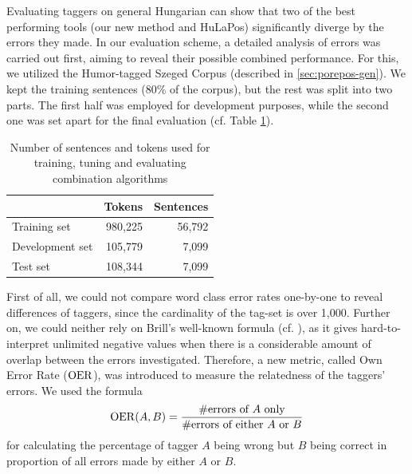 Evaluating taggers on general Hungarian can show that two of the best performing tools (our new method and HuLaPos) significantly diverge by the errors they made.
In our evaluation scheme, a detailed analysis of errors was carried out first, aiming to reveal their possible combined performance.
For this, we utilized the Humor-tagged Szeged Corpus (described in \ref{sec:porepos-gen}).
We kept the training sentences (80\% of the corpus), but the rest was split into two parts. The first half was employed for development purposes, while the second one was set apart for the final evaluation (cf. Table \ref{tab:comb-data}).

\begin{table}[H]
\centering
\caption{Number of sentences and tokens used for training, tuning and evaluating combination algorithms}\label{tab:comb-data}
\begin{tabular}{l r r}
\hline
& Tokens & Sentences \\
\hline
Training set & 980,225 & 56,792\\
Development set & 105,779 & 7,099 \\
Test set & 108,344 & 7,099 \\
\hline
\end{tabular}
\end{table}

First of all, we could not compare word class error rates one-by-one to reveal differences of taggers, since the cardinality of the tag-set is over 1,000.
Further on, we could neither rely on Brill's well-known formula (cf. \cite{Brill1998}), as it gives hard-to-interpret unlimited negative values when there is a considerable amount of overlap between the errors investigated.
Therefore, a new metric, called Own Error Rate ($\operatorname{OER}$), was introduced to measure the relatedness of the taggers' errors.
We used the formula 
\begin{equation}
\operatorname{OER}(A,B)=\frac{\text{\#errors of }A\text{ only}}{\text{\#errors of either }A\text{ or }B}
\end{equation}
for calculating the percentage of tagger $A$ being wrong but $B$ being correct in proportion of all errors made by either $A$ or $B$.


